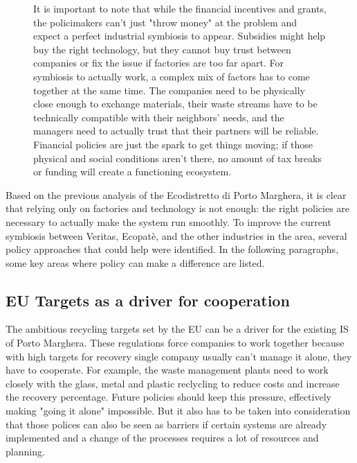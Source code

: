 \begin{figure} 
    \vspace{-20pt} %
\begin{tcolorbox}[colback=sapienza!5, colframe=sapienza, title=Key Consideration, fonttitle=\bfseries]
\small
It is important to note that while the financial incentives and grants, the policimakers can’t just "throw money" at the problem and expect a perfect industrial symbiosis to appear. Subsidies might help buy the right technology, but they cannot buy trust between companies or fix the issue if factories are too far apart. For symbiosis to actually work, a complex mix of factors has to come together at the same time. The companies need to be physically close enough to exchange materials, their waste streams have to be technically compatible with their neighbors' needs, and the managers need to actually trust that their partners will be reliable. Financial policies are just the spark to get things moving; if those physical and social conditions aren't there, no amount of tax breaks or funding will create a functioning ecosystem.
\end{tcolorbox}
\end{figure}
Based on the previous analysis of the Ecodistretto di Porto Marghera, it is clear that relying only on factories and technology is not enough: the right policies are necessary to actually make the system run smoothly. To improve the current symbiosis between Veritas, Ecopatè, and the other industries in the area, several policy approaches that could help were identified. In the following paragraphs, some key areas where policy can make a difference are listed.
\subsection{EU Targets as a driver for cooperation}
The ambitious recycling targets set by the EU can be a driver for the existing IS of Porto Marghera. These regulations force companies to work together because with high targets for recovery single company usually can't manage it alone, they have to cooperate. For example, the waste management plants need to work closely with the glass, metal and plastic reclycling to reduce costs and increase the recovery percentage. Future policies should keep this pressure, effectively making "going it alone" impossible. But it also has to be taken into consideration that those polices can also be seen as barriers if certain systems are already implemented and a change of the processes requires a lot of resources and planning. 
